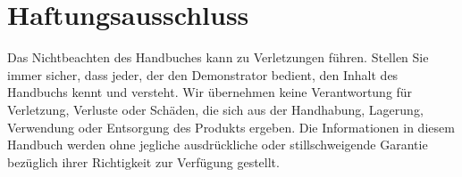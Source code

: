 %
%

\chapter{Haftungsausschluss}

Das Nichtbeachten des Handbuches kann zu Verletzungen führen. Stellen Sie immer sicher, dass jeder, der den Demonstrator bedient, den Inhalt des Handbuchs kennt und versteht. Wir übernehmen keine Verantwortung für Verletzung, Verluste oder Schäden, die sich aus der Handhabung, Lagerung, Verwendung oder Entsorgung des Produkts ergeben. Die Informationen in diesem Handbuch werden ohne jegliche ausdrückliche oder stillschweigende Garantie bezüglich ihrer Richtigkeit zur Verfügung gestellt.

